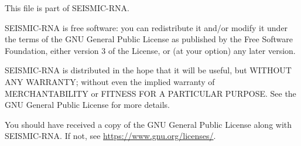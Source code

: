 \documentclass[main.tex]{subfiles}
\begin{document}
\begin{titlepage}
\noindent
This file is part of SEISMIC-RNA.

\vspace{0.25cm}

\noindent
SEISMIC-RNA is free software: you can redistribute it and/or modify it under the terms of the GNU General Public License as published by the Free Software Foundation, either version 3 of the License, or (at your option) any later version.

\vspace{0.25cm}

\noindent
SEISMIC-RNA is distributed in the hope that it will be useful, but WITHOUT ANY WARRANTY; without even the implied warranty of MERCHANTABILITY or FITNESS FOR A PARTICULAR PURPOSE. See the GNU General Public License for more details.

\vspace{0.25cm}

\noindent
You should have received a copy of the GNU General Public License along with SEISMIC-RNA. If not, see \url{https://www.gnu.org/licenses/}.


\end{titlepage}
\end{document}
